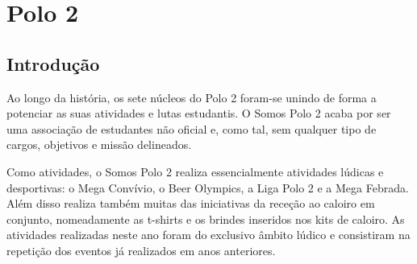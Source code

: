 
\section{Polo 2} \label{sec:polo2}

\subsection{Introdução}

Ao longo da história, os sete núcleos do Polo 2 foram-se unindo de forma a potenciar as suas atividades e lutas estudantis. O Somos Polo 2 acaba por ser uma associação de estudantes não oficial e, como tal, sem qualquer tipo de cargos, objetivos e missão delineados.

Como atividades, o Somos Polo 2 realiza essencialmente atividades lúdicas e desportivas: o Mega Convívio, o Beer Olympics, a Liga Polo 2 e a Mega Febrada. Além disso realiza também muitas das iniciativas da receção ao caloiro em conjunto, nomeadamente as t-shirts e os brindes inseridos nos kits de caloiro. As atividades realizadas neste ano foram do exclusivo âmbito lúdico e consistiram na repetição dos eventos já realizados em anos anteriores.

